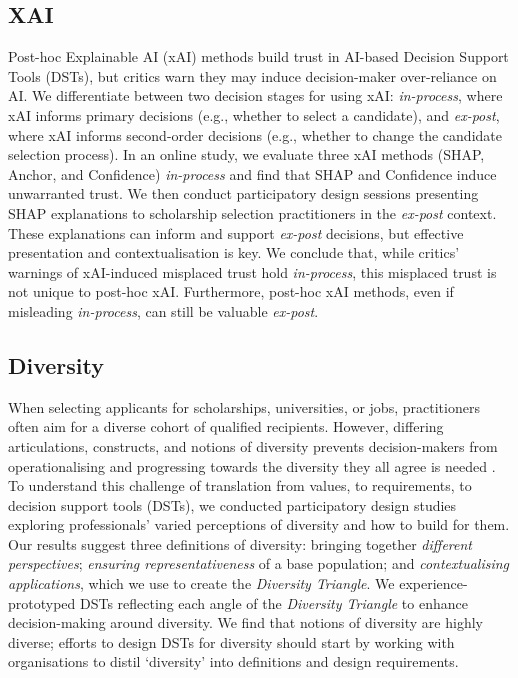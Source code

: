 \subsection{XAI}
Post-hoc Explainable AI (xAI) methods build trust in AI-based Decision Support Tools (DSTs), but critics warn they may induce decision-maker over-reliance on AI. We differentiate between two decision stages for using xAI: \emph{in-process}, where xAI informs primary decisions (e.g., whether to select a candidate), and \emph{ex-post}, where xAI informs second-order decisions (e.g., whether to change the candidate selection process). In an online study, we evaluate three xAI methods (SHAP, Anchor, and Confidence) \emph{in-process} and find that SHAP and Confidence induce unwarranted trust. We then conduct participatory design sessions presenting SHAP explanations to scholarship selection practitioners in the \emph{ex-post} context. These explanations can inform and support \emph{ex-post} decisions, but effective presentation and contextualisation is key. We conclude that, while critics’ warnings of xAI-induced misplaced trust hold \emph{in-process}, this misplaced trust is not unique to post-hoc xAI. Furthermore, post-hoc xAI methods, even if misleading \emph{in-process}, can still be valuable \emph{ex-post}.

\subsection{Diversity}
When selecting applicants for scholarships, universities, or jobs, practitioners often aim for a diverse cohort of qualified recipients. However, differing articulations, constructs, and notions of diversity prevents decision-makers from operationalising and progressing towards the diversity they all agree is needed . To understand this challenge of translation from values, to requirements, to decision support tools (DSTs), we conducted participatory design studies exploring professionals' varied perceptions of diversity and how to build for them. Our results suggest three definitions of diversity: bringing together \emph{different perspectives}; \emph{ensuring representativeness} of a base population; and \emph{contextualising applications}, which we use to create the \emph{Diversity Triangle}. We experience-prototyped DSTs reflecting each angle of the \emph{Diversity Triangle} to enhance decision-making around diversity. We find that notions of diversity are highly diverse; efforts to design DSTs for diversity should start by working with organisations to distil `diversity' into definitions and design requirements.

